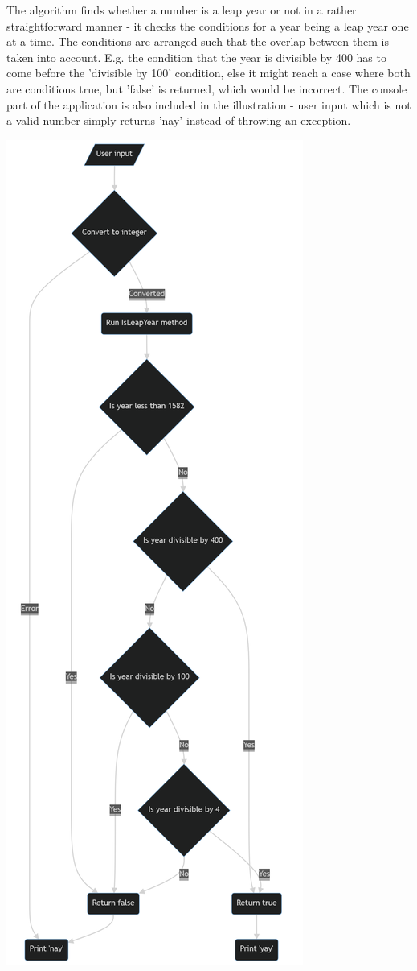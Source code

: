 \documentclass{article}
\begin{document}
The algorithm finds whether a number is a leap year or not in a rather straightforward manner - it checks the conditions for a year being a leap year one at a time.
The conditions are arranged such that the overlap between them is taken into account. 
E.g. the condition that the year is divisible by 400 has to come before the 'divisible by 100' condition, else it might reach a case where both are conditions true, but 'false' is returned, which would be incorrect.
The console part of the application is also included in the illustration - user input which is not a valid number simply returns 'nay' instead of throwing an exception.


\includegraphics[width=\textwidth,height=\textheight,keepaspectratio]{diagram.png}
\end{document}
